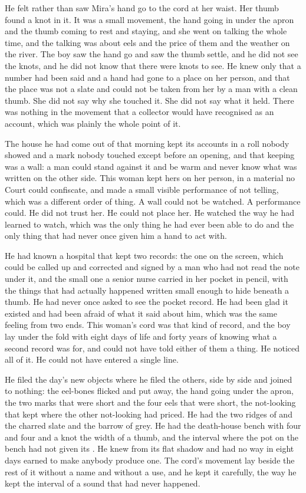 He felt rather than saw Mira's hand go to the cord at her waist. Her thumb found a knot in it. It was a small movement, the hand going in under the apron and the thumb coming to rest and staying, and she went on talking the whole time, and the talking was about eels and the price of them and the weather on the river. The boy saw the hand go and saw the thumb settle, and he did not see the knots, and he did not know that there were knots to see. He knew only that a number had been said and a hand had gone to a place on her person, and that the place was not a slate and could not be taken from her by a man with a clean thumb. She did not say why she touched it. She did not say what it held. There was nothing in the movement that a collector would have recognised as an account, which was plainly the whole point of it.

The house he had come out of that morning kept its accounts in a roll nobody showed and a mark nobody touched except before an opening, and that keeping was a wall: a man could stand against it and be warm and never know what was written on the other side. This woman kept hers on her person, in a material no Court could confiscate, and made a small visible performance of not telling, which was a different order of thing. A wall could not be watched. A performance could. He did not trust her. He could not place her. He watched the way he had learned to watch, which was the only thing he had ever been able to do and the only thing that had never once given him a hand to act with.

He had known a hospital that kept two records: the one on the screen, which could be called up and corrected and signed by a man who had not read the note under it, and the small one a senior nurse carried in her pocket in pencil, with the things that had actually happened written small enough to hide beneath a thumb. He had never once asked to see the pocket record. He had been glad it existed and had been afraid of what it said about him, which was the same feeling from two ends. This woman's cord was that kind of record, and the boy lay under the fold with eight days of life and forty years of knowing what a second record was for, and could not have told either of them a thing. He noticed all of it. He could not have entered a single line.

He filed the day's new objects where he filed the others, side by side and joined to nothing: the eel-bones flicked and put away, the hand going under the apron, the two marks that were short and the four eels that were short, the not-looking that kept where the other not-looking had priced. He had the two ridges of  and the charred slate and the barrow of grey. He had the death-house bench with four and four and a knot the width of a thumb, and the interval where the pot on the bench had not given its . He knew  from its flat shadow and had no way in eight days earned to make anybody produce one. The cord's movement lay beside the rest of it without a name and without a use, and he kept it carefully, the way he kept the interval of a sound that had never happened.

